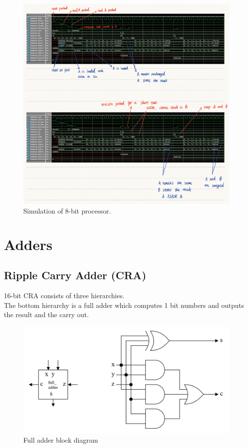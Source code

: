 \documentclass[12pt]{article}
\begin{document}
\begin{figure}[H]
    \centering
    \includegraphics{processor_simulation.png}
    \caption{Simulation of 8-bit processor.}
\end{figure}

\section{Adders}
\subsection{Ripple Carry Adder (CRA)}
16-bit CRA consists of three hierarchies. \\

The bottom hierarchy is a full adder which computes 1 bit numbers and outputs the result and the carry out. \\

\begin{figure}[H]
    \centering
    \includegraphics[width=15cm]{full_adder.png}
    \caption{Full adder block diagram \cite{GG4.3}}
\end{figure}
\end{document}
